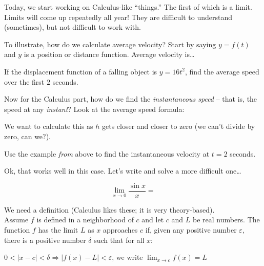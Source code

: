 \documentclass[11pt]{article}
\begin{document}
Today, we start working on Calculus-like ``things.'' The first of which is a limit. Limits will come up repeatedly all year! They are difficult to understand (sometimes), but not difficult to work with.

\vspace{0.5cm}

\noindent To illustrate, how do we calculate average velocity? Start by saying $y = f(t)$ and $y$ is a position or distance function. Average velocity is\dots

\vspace{1.5cm}

\noindent If the displacement function of a falling object is $y=16t^2$, find the average speed over the first $2$ seconds.

\vspace{1.5cm}

\noindent Now for the Calculus part, how do we find the \emph{instantaneous speed} -- that is, the speed at any \emph{instant}? Look at the average speed formula:

\vspace{1.5cm}

\noindent We want to calculate this as $h$ gets closer and closer to zero (we can't divide by zero, can we?).

\vspace{1.5cm}

\noindent Use the example \emph{from} above to find the instantaneous velocity at $t = 2$ seconds.

\vspace{1.5cm}

\noindent Ok, that works well in this case. Let's write and solve a more difficult one\dots

\[\lim_{x\to0} \frac{\sin x}{x} =\]

\newpage

We need a definition (Calculus likes these; it is very theory-based).\\
Assume $f$ is defined in a neighborhood of $c$ and let $c$ and $L$ be real numbers. The function $f$ has the limit $L$ as $x$ approaches $c$ if, given any positive number $\varepsilon$, there is a positive number $\delta$ such that for all $x$:

\vspace{0.5cm}

$0 < |x - c| < \delta \Rightarrow |f(x) - L| < \varepsilon$, we write $\lim_{x\to c} f(x) = L$

\vspace{0.5cm}
\end{document}
